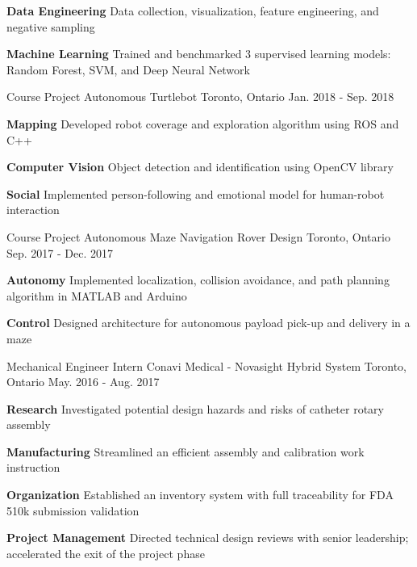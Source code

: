 \begin{cventries}
{\begin{cvitems}
			\item {\textbf{Data Engineering} Data collection, visualization, feature engineering, and negative sampling}
			\item {\textbf{Machine Learning} Trained and benchmarked 3 supervised learning models: Random Forest, SVM, and Deep Neural Network}
		\end{cvitems}
	}
	\cventry
	{Course Project}
	{Autonomous Turtlebot}
	{Toronto, Ontario}
	{Jan. 2018 - Sep. 2018}
	{
		\begin{cvitems}
			\item {\textbf{Mapping} Developed robot coverage and exploration algorithm using ROS and C++}
			\item {\textbf{Computer Vision} Object detection and identification using OpenCV library}
			\item {\textbf{Social} Implemented person-following and emotional model for human-robot interaction}
		\end{cvitems}
	}
	\cventry
	{Course Project}
	{Autonomous Maze Navigation Rover Design}
	{Toronto, Ontario}
	{Sep. 2017 - Dec. 2017}
	{
		\begin{cvitems}
			\item { \textbf{Autonomy} Implemented localization, collision avoidance, and path planning algorithm in MATLAB and Arduino}
			\item { \textbf{Control} Designed architecture for autonomous payload pick-up and delivery in a maze}
		\end{cvitems}
	}
	\cventry
	{Mechanical Engineer Intern}
	{Conavi Medical - Novasight Hybrid System} 
	{Toronto, Ontario}
	{May. 2016 - Aug. 2017}
	{
		\begin{cvitems}
			\item {
				\textbf{Research} Investigated potential design hazards and risks of catheter rotary assembly
			}
			\item {
				\textbf{Manufacturing} Streamlined an efficient assembly and calibration work instruction}
			\item {
				\textbf{Organization} Established an inventory system with full traceability for FDA 510k submission validation}
			\item {
				\textbf{Project Management} Directed technical design reviews with senior leadership; accelerated the exit of the project phase}
		\end{cvitems}
	}  
\end{cventries}
